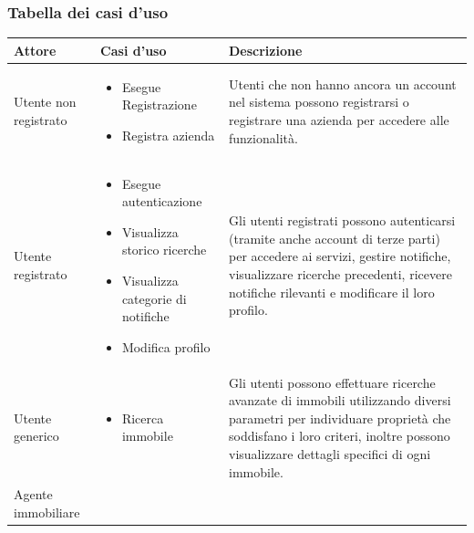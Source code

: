 \documentclass{article}
\begin{document}
\subsubsection{Tabella dei casi d'uso}
\begin{tabularx}{\textwidth}{|>{\raggedright\arraybackslash}X|>{\raggedright\arraybackslash}X|>{\raggedright\arraybackslash}X|}
    \hline
    \textbf{Attore}                               & \textbf{Casi d'uso} & \textbf{Descrizione}                                                                                                                                 \\
    \hline
    Utente non registrato                         &
    \begin{itemize}
        \item Esegue Registrazione
        \item Registra azienda
    \end{itemize}                    &
    Utenti che non hanno ancora un account nel sistema possono registrarsi o registrare una azienda per accedere alle funzionalità.                                                                                            \\
    \hline
    Utente registrato                             &
    \begin{itemize}
        \item Esegue autenticazione
        \item Visualizza storico ricerche
        \item Visualizza categorie di notifiche
        \item Modifica profilo
    \end{itemize}       &
    Gli utenti registrati possono autenticarsi (tramite anche account di terze parti) per accedere ai servizi, gestire notifiche, visualizzare ricerche precedenti, ricevere notifiche rilevanti e modificare il loro profilo. \\
    \hline
    Utente generico                               &
    \begin{itemize}
        \item Ricerca immobile
    \end{itemize}                        &
    Gli utenti possono effettuare ricerche avanzate di immobili utilizzando diversi parametri per individuare proprietà che soddisfano i loro criteri, inoltre possono visualizzare dettagli specifici di ogni immobile.       \\
    \hline
    Agente immobiliare                            &

\end{tabularx}
\end{document}
